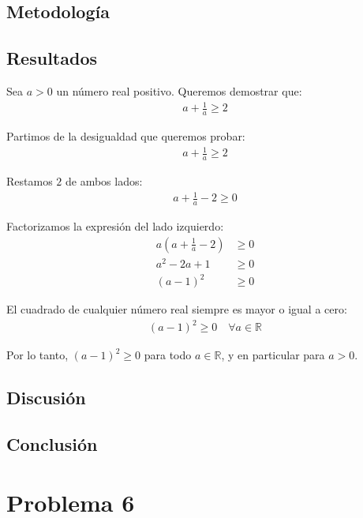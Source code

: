 \documentclass{article}
\begin{document}
\subsection{Metodología}

\subsection{Resultados}
\setcounter{equation}{0}

Sea $a > 0$ un número real positivo. Queremos demostrar que:
\begin{align}
a + \frac{1}{a} \geq 2
\end{align}

Partimos de la desigualdad que queremos probar:
\begin{align}
a + \frac{1}{a} \geq 2
\end{align}

Restamos $2$ de ambos lados:
\begin{align}
a + \frac{1}{a} - 2 \geq 0
\end{align}

Factorizamos la expresión del lado izquierdo:
\begin{align}
a\left(a + \frac{1}{a} - 2\right) &\geq 0 \\
a^2 - 2a + 1 &\geq 0 \\
(a - 1)^2 &\geq 0
\end{align}

El cuadrado de cualquier número real siempre es mayor o igual a cero:
\begin{align}
(a - 1)^2 \geq 0 \quad \forall a \in \mathbb{R}
\end{align}

Por lo tanto, $(a - 1)^2 \geq 0$ para todo $a \in \mathbb{R}$, y en particular para $a > 0$.


\subsection{Discusión}

\subsection{Conclusión}

\section{Problema 6}
\end{document}
